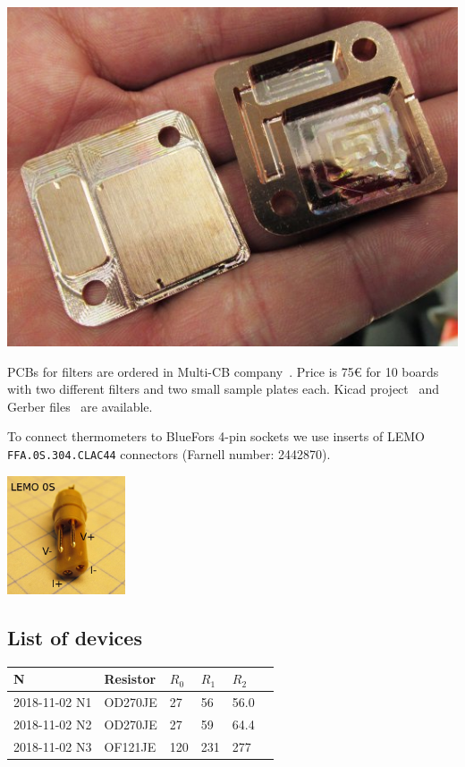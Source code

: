 \documentclass[a4paper]{article}
\begin{document}
\begin{center}
\includegraphics[width=\linewidth]{img/box.jpg}
\end{center}

PCBs for filters are ordered in Multi-CB company~\cite{multi-cb}. Price
is 75\euro{} for 10 boards with two different filters and two small
sample plates each. Kicad project~\cite{filterpcb-kicad} and Gerber
files~\cite{filterpcb-gerber} are available.

To connect thermometers to BlueFors 4-pin sockets we use inserts
of LEMO {\tt FFA.0S.304.CLAC44} connectors (Farnell number: 2442870).

\begin{center}
\includegraphics[width=3.5cm]{img/conn.jpg}
\end{center}

\subsection*{List of devices}

\noindent
\begin{tabular}{|ll lll l|}\hline
N& Resistor& $R_0$ & $R_1$ & $R_2$ & \\
\hline
2018-11-02 N1&OD270JE& 27  & 56  & 56.0&\\
2018-11-02 N2&OD270JE& 27  & 59  & 64.4&\\
2018-11-02 N3&OF121JE& 120 & 231 & 277&\\
\hline
\end{tabular}
\medskip
\end{document}
